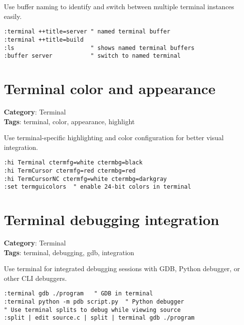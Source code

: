 {{{{{{{{{Use buffer naming to identify and switch between multiple terminal instances easily.

\begin{Exa*}{}
\begin{Verbatim}[fontsize=\footnotesize, breaklines, breakanywhere]
:terminal ++title=server " named terminal buffer
:terminal ++title=build
:ls                      " shows named terminal buffers
:buffer server           " switch to named terminal
\end{Verbatim}
\end{Exa*}

\section{Terminal color and appearance}

\textbf{Category}: Terminal\\ \textbf{Tags}: terminal, color, appearance, highlight
\vspace{0.5cm}

Use terminal-specific highlighting and color configuration for better visual integration.

\begin{Exa*}{}
\begin{Verbatim}[fontsize=\footnotesize, breaklines, breakanywhere]
:hi Terminal ctermfg=white ctermbg=black
:hi TermCursor ctermfg=red ctermbg=red
:hi TermCursorNC ctermfg=white ctermbg=darkgray
:set termguicolors  " enable 24-bit colors in terminal
\end{Verbatim}
\end{Exa*}

\section{Terminal debugging integration}

\textbf{Category}: Terminal\\ \textbf{Tags}: terminal, debugging, gdb, integration
\vspace{0.5cm}

Use terminal for integrated debugging sessions with GDB, Python debugger, or other CLI debuggers.

\begin{Exa*}{}
\begin{Verbatim}[fontsize=\footnotesize, breaklines, breakanywhere]
:terminal gdb ./program   " GDB in terminal
:terminal python -m pdb script.py  " Python debugger
" Use terminal splits to debug while viewing source
:split | edit source.c | split | terminal gdb ./program
\end{Verbatim}
\end{Exa*}

}}}}}}}}}
